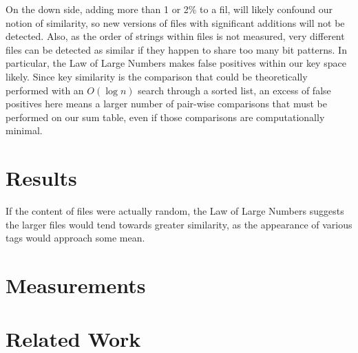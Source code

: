 \documentclass[10pt, twocolumn]{article}
\begin{document}
On the down side, adding more than 1 or 2\% to a fil, will likely confound our notion of similarity, so new versions of files with significant additions will not be detected.  Also, as the order of strings within files is not measured, very different files can be detected as similar if they happen to share too many bit patterns.  In particular, the Law of Large Numbers makes false positives within our key space likely.  Since key similarity is the comparison that could be theoretically performed with an $O(\log n)$ search through a sorted list, an excess of false positives here means a larger number of pair-wise comparisons that must be performed on our sum table, even if those comparisons are computationally minimal.



\section{Results}





 If the content of files were actually random, the Law of Large Numbers suggests the larger files would tend towards greater similarity, as the appearance of various tags would approach some mean.  




\section{Measurements}


\section{Related Work}
\end{document}
